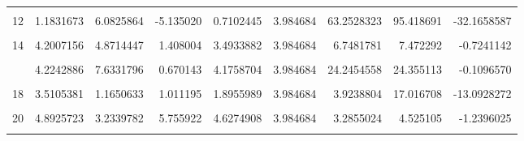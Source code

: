 \documentclass[]{tufte-handout}
\begin{document}
\begin{table}
{\begin{tabular}[t]{rrrrrrrrr}
\addlinespace
\cellcolor{gray!6}{11} & \cellcolor{gray!6}{4.3832517} & \cellcolor{gray!6}{4.1297346} & \cellcolor{gray!6}{4.668041} & \cellcolor{gray!6}{4.3936757} & \cellcolor{gray!6}{3.984684} & \cellcolor{gray!6}{0.1450498} & \cellcolor{gray!6}{0.646873} & \cellcolor{gray!6}{-0.5018232}\\
12 & 1.1831673 & 6.0825864 & -5.135020 & 0.7102445 & 3.984684 & 63.2528323 & 95.418691 & -32.1658587\\
\cellcolor{gray!6}{13} & \cellcolor{gray!6}{4.0711975} & \cellcolor{gray!6}{1.1562107} & \cellcolor{gray!6}{3.308821} & \cellcolor{gray!6}{2.8454097} & \cellcolor{gray!6}{3.984684} & \cellcolor{gray!6}{4.5706989} & \cellcolor{gray!6}{8.464535} & \cellcolor{gray!6}{-3.8938363}\\
14 & 4.2007156 & 4.8714447 & 1.408004 & 3.4933882 & 3.984684 & 6.7481781 & 7.472292 & -0.7241142\\
\cellcolor{gray!6}{15} & \cellcolor{gray!6}{4.5775337} & \cellcolor{gray!6}{4.0539793} & \cellcolor{gray!6}{8.293052} & \cellcolor{gray!6}{5.6415218} & \cellcolor{gray!6}{3.984684} & \cellcolor{gray!6}{10.6829771} & \cellcolor{gray!6}{18.918314} & \cellcolor{gray!6}{-8.2353368}\\
\addlinespace
16 & 4.2242886 & 7.6331796 & 0.670143 & 4.1758704 & 3.984684 & 24.2454558 & 24.355113 & -0.1096570\\
\cellcolor{gray!6}{17} & \cellcolor{gray!6}{6.0319595} & \cellcolor{gray!6}{1.6244979} & \cellcolor{gray!6}{0.282768} & \cellcolor{gray!6}{2.6464085} & \cellcolor{gray!6}{3.984684} & \cellcolor{gray!6}{18.0930536} & \cellcolor{gray!6}{23.465996} & \cellcolor{gray!6}{-5.3729427}\\
18 & 3.5105381 & 1.1650633 & 1.011195 & 1.8955989 & 3.984684 & 3.9238804 & 17.016708 & -13.0928272\\
\cellcolor{gray!6}{19} & \cellcolor{gray!6}{5.7761526} & \cellcolor{gray!6}{7.5624690} & \cellcolor{gray!6}{1.102853} & \cellcolor{gray!6}{4.8138250} & \cellcolor{gray!6}{3.984684} & \cellcolor{gray!6}{22.2524298} & \cellcolor{gray!6}{24.314855} & \cellcolor{gray!6}{-2.0624253}\\
20 & 4.8925723 & 3.2339782 & 5.755922 & 4.6274908 & 3.984684 & 3.2855024 & 4.525105 & -1.2396025\\
\addlinespace
\cellcolor{gray!6}{21} & \cellcolor{gray!6}{4.7781403} & \cellcolor{gray!6}{3.3230197} & \cellcolor{gray!6}{9.156763} & \cellcolor{gray!6}{5.7526409} & \cellcolor{gray!6}{3.984684} & \cellcolor{gray!6}{18.4407557} & \cellcolor{gray!6}{27.817773} & \cellcolor{gray!6}{-9.3770171}\\

\end{tabular}}
\end{table}
\end{document}
